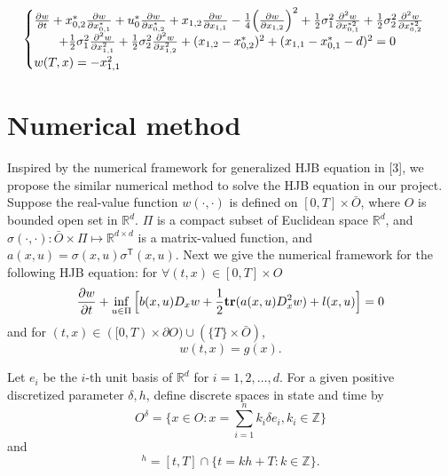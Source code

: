 \documentclass{article}
\begin{document}
\begin{equation*}
    \begin{cases}
    \frac{\partial w}{\partial t} + x_{0,2}^{*} \frac{\partial w}{\partial x_{0, 1}^{*}} + u_{0}^{*} \frac{\partial w}{\partial x_{0, 2}^{*}} + x_{1,2} \frac{\partial w}{\partial x_{1, 1}} - \frac{1}{4} \Big{(}\frac{\partial w}{\partial x_{1, 2}} \Big{)}^{2} + \frac{1}{2} \sigma_{1}^{2} \frac{\partial^{2} w}{\partial x_{0, 1}^{* 2}} + \frac{1}{2} \sigma_{2}^{2} \frac{\partial^{2} w}{\partial x_{0, 2}^{* 2}}  \\
   \qquad + \frac{1}{2} \sigma_{1}^{2} \frac{\partial^{2} w}{\partial x_{1, 1}^{2}} + \frac{1}{2} \sigma_{2}^{2} \frac{\partial^{2} w}{\partial x_{1, 2}^{2}} + (x_{1, 2} - x_{0, 2}^{*})^{2} + (x_{1, 1} - x_{0, 1}^{*} - d)^{2}   = 0  \\
   w(T, x) = - x_{1, 1}^{2}
   \end{cases}
\end{equation*}

\section{Numerical method}

Inspired by the numerical framework for generalized HJB equation in [3], we propose the similar numerical method to solve the HJB equation in our project. Suppose the real-value function $w(\cdot, \cdot)$ is defined on $[0, T] \times \bar{O}$, where $O$ is bounded open set in $\mathbb{R}^{d}$. $\Pi$ is a compact subset of Euclidean space $\mathbb{R}^{d}$, and $\sigma(\cdot, \cdot): \bar{O} \times \Pi \mapsto \mathbb{R}^{d \times d}$ is a matrix-valued function, and $a(x, u) = \sigma(x, u) \sigma^\mathsf{T} (x, u)$. Next we give the numerical framework for the following HJB equation: for $\forall (t, x) \in [0, T] \times O$
\begin{equation} \label{HJB, numerical}
    \frac{\partial w}{\partial t} + \inf_{u \in \Pi} \Big{[} b(x, u) D_{x} w + \frac{1}{2} \textbf{tr} (a(x, u) D_{x}^{2} w) + l(x, u) \Big{]} = 0
\end{equation}
and for $(t, x) \in ([0, T) \times \partial O) \cup (\{T\} \times \bar{O})$,
\begin{equation*}
    w(t, x) = g(x).
\end{equation*}

Let $e_{i}$ be the $i$-th unit basis of $\mathbb{R}^{d}$ for $i = 1, 2, \dots, d$. For a given positive discretized parameter $\delta, h$, define discrete spaces in state and time by
\begin{equation}
    O^{\delta} = \{x \in O: x = \sum_{i = 1}^{n} k_{i} \delta e_{i}, k_{i} \in \mathbb{Z} \}
\end{equation}
and
\begin{equation}
    [t, T]^{h} = [t, T] \cap \{t = k h + T: k \in \mathbb{Z} \}.
\end{equation}
\end{document}
